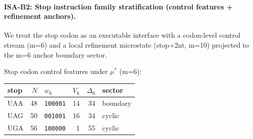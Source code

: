 \paragraph{ISA-B2: Stop instruction family stratification (control features + refinement anchors).}
We treat the stop codon as an executable interface with a codon-level control stream (m=6) and a local refinement microstate (stop+2nt, m=10) projected to the m=6 anchor boundary sector.

\noindent Stop codon control features under $\mu^\ast$ (m=6):
\begin{center}
\small
\setlength{\tabcolsep}{6pt}
\renewcommand{\arraystretch}{1.15}
\begin{tabular}{l r l r r l}
\toprule
stop & $N$ & $w_6$ & $V_6$ & $\Delta_6$ & sector \\
\midrule
UAA & 48 & \texttt{100001} & 14 & 34 & boundary \\
UAG & 50 & \texttt{001001} & 16 & 34 & cyclic \\
UGA & 56 & \texttt{100000} & 1 & 55 & cyclic \\
\bottomrule
\end{tabular}
\end{center}

